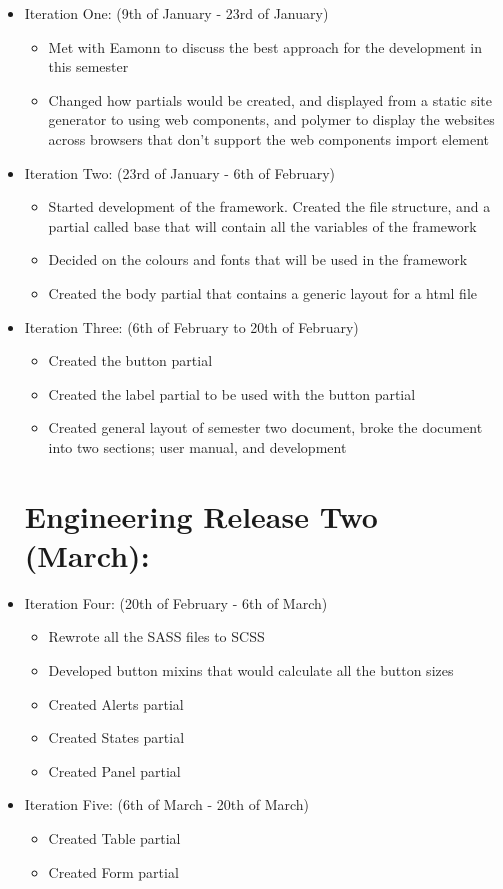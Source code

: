 \begin{itemize}
	\item Iteration One: (9th of January - 23rd of January)\begin{itemize} 
	\item Met with Eamonn to discuss the best approach for the development in this semester
	\item Changed how partials would be created, and displayed from a static site generator to using web components, and polymer to display the websites across browsers that don't support the web components import element
	\end{itemize}
	\item Iteration Two: (23rd of January - 6th of February) \begin{itemize}
	\item Started development of the framework. Created the file structure, and a partial called base that will contain all the variables of the framework
	\item Decided on the colours and fonts that will be used in the framework
	\item Created the body partial that contains a generic layout for a html file
	\end{itemize}
	\item Iteration Three: (6th of February to 20th of February)\begin{itemize}
	\item Created the button partial
	\item Created the label partial to be used with the button partial
	\item Created general layout of semester two document, broke the document into two sections; user manual, and development
	\end{itemize}
	\section*{Engineering Release Two (March):}
	\item Iteration Four: (20th of February - 6th of March)\begin{itemize} 
	\item Rewrote all the SASS files to SCSS
	\item Developed button mixins that would calculate all the button sizes
	\item Created Alerts partial
	\item Created States partial
	\item Created Panel partial
	\end{itemize}
	\item Iteration Five: (6th of March - 20th of March) \begin{itemize}
	\item Created Table partial
	\item Created Form partial
	\end{itemize}

\end{itemize}
